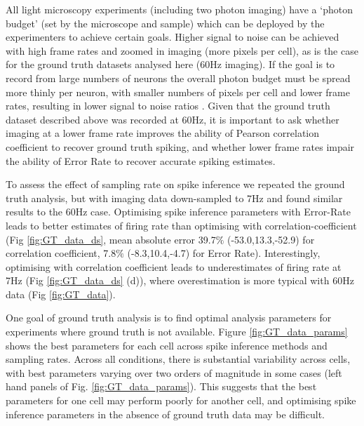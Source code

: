 \documentclass[a4paper,10pt,twocolumn]{article}
\begin{document}

All light microscopy experiments (including two photon imaging) have a `photon budget' (set by the microscope and sample) which can be deployed by the experimenters to achieve certain goals. Higher signal to noise can be achieved with high frame rates and zoomed in imaging (more pixels per cell), as is the case for the ground truth datasets analysed here (60Hz imaging). If the goal is to record from large numbers of neurons the overall photon budget must be spread more thinly per neuron, with smaller numbers of pixels per cell and lower frame rates, resulting in lower signal to noise ratios \citep{Peron2015-qz}. %
Given that the ground truth dataset described above was recorded at 60Hz, it is important to ask whether imaging at a lower frame rate improves the ability of Pearson correlation coefficient to recover ground truth spiking, and whether lower frame rates impair the ability of Error Rate to recover accurate spiking estimates.

To assess the effect of sampling rate on spike inference we repeated the ground truth analysis, but with imaging data down-sampled to 7Hz and found similar results to the 60Hz case. Optimising spike inference parameters with Error-Rate leads to better estimates of firing rate than optimising with correlation-coefficient (Fig \ref{fig:GT_data_ds}, mean absolute error 39.7$\%$ (-53.0,13.3,-52.9) for correlation coefficient, 7.8$\%$ (-8.3,10.4,-4.7) for Error Rate). Interestingly, optimising with correlation coefficient leads to underestimates of firing rate at 7Hz (Fig \ref{fig:GT_data_ds} (d)), where overestimation is more typical with 60Hz data (Fig \ref{fig:GT_data}).


One goal of ground truth analysis is to find optimal analysis parameters for experiments where ground truth is not available. Figure \ref{fig:GT_data_params} shows the best parameters for each cell across spike inference methods and sampling rates. Across all conditions, there is substantial variability across cells, with best parameters varying over two orders of magnitude in some cases (left hand panels of Fig. \ref{fig:GT_data_params}). This suggests that the best parameters for one cell may perform poorly for another cell, and optimising spike inference parameters in the absence of ground truth data may be difficult.
\end{document}
